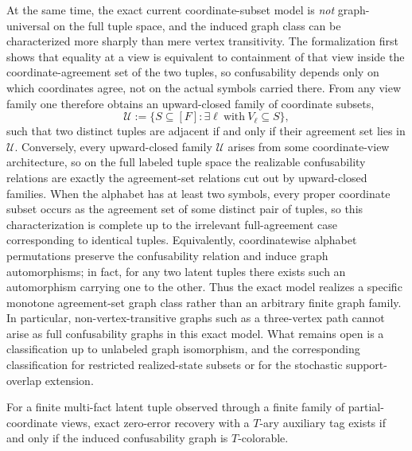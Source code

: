 At the same time, the exact current coordinate-subset model is \emph{not} graph-universal on the full tuple space, and the induced graph class can be characterized more sharply than mere vertex transitivity. The formalization first shows that equality at a view is equivalent to containment of that view inside the coordinate-agreement set of the two tuples, so confusability depends only on which coordinates agree, not on the actual symbols carried there. From any view family one therefore obtains an upward-closed family of coordinate subsets,
\[
\mathcal U := \{S \subseteq [F] : \exists \ell\ \text{with}\ V_\ell \subseteq S\},
\]
such that two distinct tuples are adjacent if and only if their agreement set lies in $\mathcal U$. Conversely, every upward-closed family $\mathcal U$ arises from some coordinate-view architecture, so on the full labeled tuple space the realizable confusability relations are exactly the agreement-set relations cut out by upward-closed families. When the alphabet has at least two symbols, every proper coordinate subset occurs as the agreement set of some distinct pair of tuples, so this characterization is complete up to the irrelevant full-agreement case corresponding to identical tuples. Equivalently, coordinatewise alphabet permutations preserve the confusability relation and induce graph automorphisms; in fact, for any two latent tuples there exists such an automorphism carrying one to the other. Thus the exact model realizes a specific monotone agreement-set graph class rather than an arbitrary finite graph family. In particular, non-vertex-transitive graphs such as a three-vertex path cannot arise as full confusability graphs in this exact model. What remains open is a classification up to unlabeled graph isomorphism, and the corresponding classification for restricted realized-state subsets or for the stochastic support-overlap extension.

\begin{theorem}\label{thm:multifact-colorability}
For a finite multi-fact latent tuple observed through a finite family of partial-coordinate views, exact zero-error recovery with a $T$-ary auxiliary tag exists if and only if the induced confusability graph is $T$-colorable.
\end{theorem}

